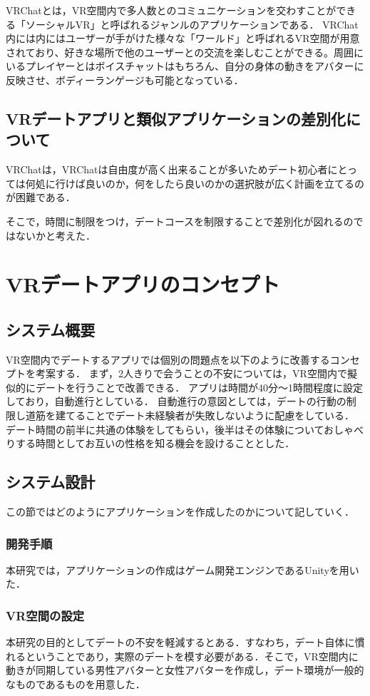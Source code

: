 \documentclass[12pt,a4j,titlepage]{ltjsarticle}
\begin{document}
VRChatとは，VR空間内で多人数とのコミュニケーションを交わすことができる「ソーシャルVR」と呼ばれるジャンルのアプリケーションである．
VRChat内には内にはユーザーが手がけた様々な「ワールド」と呼ばれるVR空間が用意されており、好きな場所で他のユーザーとの交流を楽しむことができる。周囲にいるプレイヤーとはボイスチャットはもちろん、自分の身体の動きをアバターに反映させ、ボディーランゲージも可能となっている．
\subsection{VRデートアプリと類似アプリケーションの差別化について}
VRChatは，VRChatは自由度が高く出来ることが多いためデート初心者にとっては何処に行けば良いのか，何をしたら良いのかの選択肢が広く計画を立てるのが困難である．

そこで，時間に制限をつけ，デートコースを制限することで差別化が図れるのではないかと考えた．

\clearpage

\section{VRデートアプリのコンセプト}
\subsection{システム概要}\label{システム概要}
VR空間内でデートするアプリでは個別の問題点を以下のように改善するコンセプトを考案する．
まず，2人きりで会うことの不安については，VR空間内で擬似的にデートを行うことで改善できる．
アプリは時間が40分〜1時間程度に設定しており，自動進行としている．
自動進行の意図としては，デートの行動の制限し道筋を建てることでデート未経験者が失敗しないように配慮をしている．
デート時間の前半に共通の体験をしてもらい，後半はその体験についておしゃべりする時間としてお互いの性格を知る機会を設けることとした．
\label{sec:0}
\subsection{システム設計}
この節ではどのようにアプリケーションを作成したのかについて記していく．
\subsubsection{開発手順}
本研究では，アプリケーションの作成はゲーム開発エンジンであるUnityを用いた．
\label{sec:0}
\subsubsection{VR空間の設定}
本研究の目的としてデートの不安を軽減するとある．すなわち，デート自体に慣れるということであり，実際のデートを模す必要がある．そこで，VR空間内に動きが同期している男性アバターと女性アバターを作成し，デート環境が一般的なものであるものを用意した．
\end{document}
